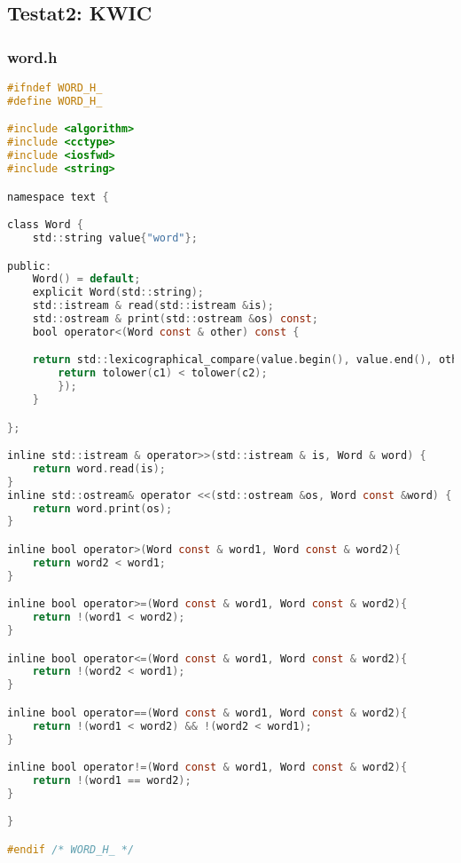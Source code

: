 
\subsection{Testat2: KWIC}

\subsubsection{word.h}
\begin{lstlisting}[style=frame, style= linenumbers, language=C]
#ifndef WORD_H_
#define WORD_H_

#include <algorithm>
#include <cctype>
#include <iosfwd>
#include <string>

namespace text {

class Word {
	std::string value{"word"};

public:
	Word() = default;
	explicit Word(std::string);
	std::istream & read(std::istream &is);
	std::ostream & print(std::ostream &os) const;
	bool operator<(Word const & other) const {

	return std::lexicographical_compare(value.begin(), value.end(), other.value.begin(), other.value.end(), [](char c1, char c2) {
		return tolower(c1) < tolower(c2);
		});
	}

};

inline std::istream & operator>>(std::istream & is, Word & word) {
    return word.read(is);
}
inline std::ostream& operator <<(std::ostream &os, Word const &word) {
	return word.print(os);
}

inline bool operator>(Word const & word1, Word const & word2){
	return word2 < word1;
}

inline bool operator>=(Word const & word1, Word const & word2){
	return !(word1 < word2);
}

inline bool operator<=(Word const & word1, Word const & word2){
	return !(word2 < word1);
}

inline bool operator==(Word const & word1, Word const & word2){
	return !(word1 < word2) && !(word2 < word1);
}

inline bool operator!=(Word const & word1, Word const & word2){
	return !(word1 == word2);
}

}

#endif /* WORD_H_ */
\end{lstlisting}

